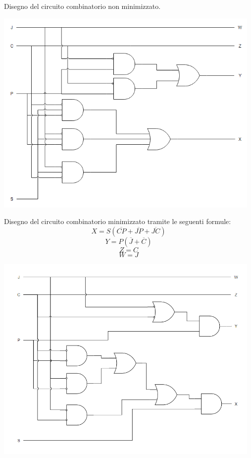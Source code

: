 \begin{questions}
\begin{solution}
            Disegno del circuito combinatorio non minimizzato.
                    \begin{center}
                        \includegraphics[width=13cm, keepaspectratio]{img/carpi_diagramma_no_min.png}
                    \end{center}
            \newpage
            Disegno del circuito combinatorio minimizzato tramite le seguenti formule:    
                \[ X = S(\overline{CP} + \overline{JP} + \overline{JC})\]
                \[ Y = P(\overline{J} +\overline{C})\]
                \[ Z = C \]
                \[ W = J \]
                    \begin{center}
                            \includegraphics[width=13cm, keepaspectratio]{img/carpi_diagramma.png}
                    \end{center}
                 

    \end{solution}
\end{questions}